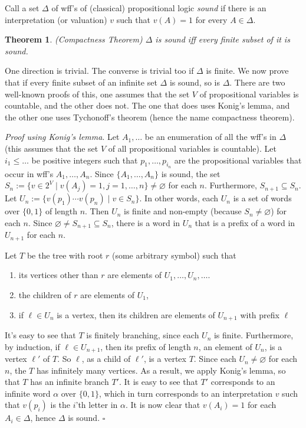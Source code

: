 \documentclass[12pt]{article}
\newtheorem{thm}{Theorem}
\begin{document}
Call a set $\Delta$ of wff's of (classical) propositional logic \emph{sound} if there is an interpretation (or valuation) $v$ such that $v(A)=1$ for every $A\in \Delta$.

\begin{thm} (Compactness Theorem)  $\Delta$ is sound iff every finite subset of it is sound. \end{thm}
One direction is trivial.  The converse is trivial too if $\Delta$ is finite.  We now prove that if every finite subset of an infinite set $\Delta$ is sound, so is $\Delta$.  There are two well-known proofs of this, one assumes that the set $V$ of propositional variables is countable, and the other does not.  The one that does uses Konig's lemma, and the other one uses Tychonoff's theorem (hence the name compactness theorem).

\textit{Proof using Konig's lemma}. 
Let $A_1,\ldots$ be an enumeration of all the wff's in $\Delta$ (this assumes that the set $V$ of all propositional variables is countable).  Let $i_1 \le \ldots$ be positive integers such that $p_1, \ldots, p_{i_n}$ are the propositional variables that occur in wff's $A_1,\ldots, A_n$.  Since $\lbrace A_1,\ldots, A_n\rbrace$ is sound, the set $S_n:=\lbrace v\in 2^V \mid v(A_j)=1, j=1,\ldots,n \rbrace \ne \varnothing$ for each $n$.  Furthermore, $S_{n+1} \subseteq S_n$.  Let $U_n:=\lbrace v(p_1)\cdots v(p_n)\mid v\in S_n \rbrace$.  In other words, each $U_n$ is a set of words over $\lbrace 0,1\rbrace$ of length $n$.  Then $U_n$ is finite and non-empty (because $S_n \ne \varnothing$) for each $n$.  Since $\varnothing \ne S_{n+1}\subseteq S_n$, there is a word in $U_n$ that is a prefix of a word in $U_{n+1}$ for each $n$.

Let $T$ be the tree with root $r$ (some arbitrary symbol) such that
\begin{enumerate}
\item its vertices other than $r$ are elements of $U_1,\ldots, U_n, \ldots$.
\item the children of $r$ are elements of $U_1$,
\item if $\ell \in U_n$ is a vertex, then its children are elements of $U_{n+1}$ with prefix $\ell$
\end{enumerate} 
It's easy to see that $T$ is finitely branching, since each $U_n$ is finite.  Furthermore, by induction, if $\ell \in U_{n+1}$, then its prefix of length $n$, an element of $U_n$, is a vertex $\ell'$ of $T$.  So $\ell$, as a child of $\ell'$, is a vertex $T$.  Since each $U_n \ne \varnothing$ for each $n$, the $T$ has infinitely many vertices.  As a result, we apply Konig's lemma, so that $T$ has an infinite branch $T'$.  It is easy to see that $T'$ corresponds to an infinite word $\alpha$ over $\lbrace 0,1\rbrace$, which in turn corresponds to an interpretation $v$ such that $v(p_i)$ is the $i$'th letter in $\alpha$.  It is now clear that $v(A_i)=1$ for each $A_i\in \Delta$, hence $\Delta$ is sound.
\hfill $\square$
\end{document}
